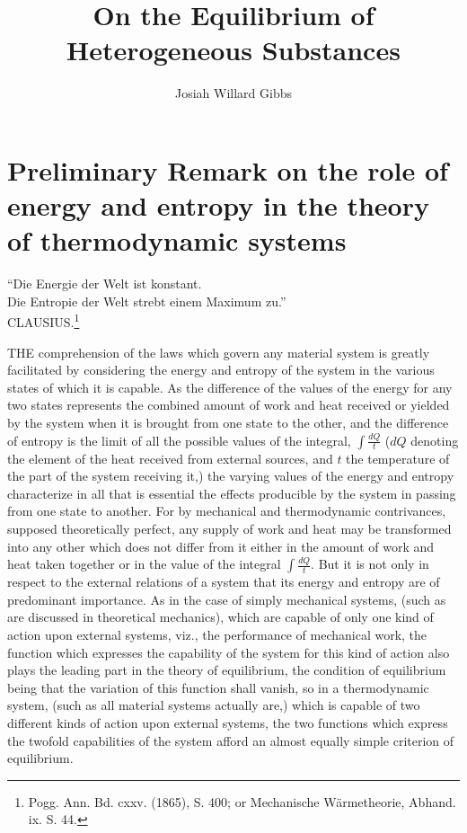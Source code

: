 \documentclass[12pt]{memoir}
\title{On the Equilibrium of Heterogeneous Substances}
\author{Josiah Willard Gibbs}
\date{}
\begin{document}
\maketitle
\thispagestyle{empty}
% 

\tableofcontents
\section{Preliminary Remark on the role of energy and entropy in the theory of thermodynamic systems}
``Die Energie der Welt ist konstant. \\
Die Entropie der Welt strebt einem Maximum zu.'' \\
CLAUSIUS.\footnote{Pogg. Ann. Bd. cxxv. (1865), S. 400; or Mechanische W{\"a}rmetheorie, Abhand. ix. S. 44.}

THE comprehension of the laws which govern any material system is greatly facilitated by considering the energy and entropy of the system in the various states of which it is capable. As the difference of the values of the energy for any two states represents the combined amount of work and heat received or yielded by the system when it is brought from one state to the other, and the difference of entropy is the limit of all the possible values of the integral, $\int \frac{dQ}{t}$ ($dQ$ denoting the element of the heat received from external sources, and $t$ the temperature of the part of the system receiving it,) the varying values of the energy and entropy characterize in all that is essential the effects producible by the system in passing from one state to another. For by mechanical and thermodynamic contrivances, supposed theoretically perfect, any supply of work and heat may be transformed into any other which does not differ from it either in the amount of work and heat taken together or in the value of the integral $\int \frac{dQ}{t}$. But it is not only in respect to the external relations of a system that its energy and entropy are of predominant importance. As in the case of simply mechanical systems, (such as are discussed in theoretical mechanics), which are capable of only one kind of action upon external systems, viz., the performance of mechanical work, the function which expresses the capability of the system for this kind of action also plays the leading part in the theory of equilibrium, the condition of equilibrium being that the variation of this function shall vanish, so in a thermodynamic system, (such as all material systems actually are,) which is capable of two different kinds of action upon external systems, the two functions which express the twofold capabilities of the system afford an almost equally simple criterion of equilibrium.
\end{document}

